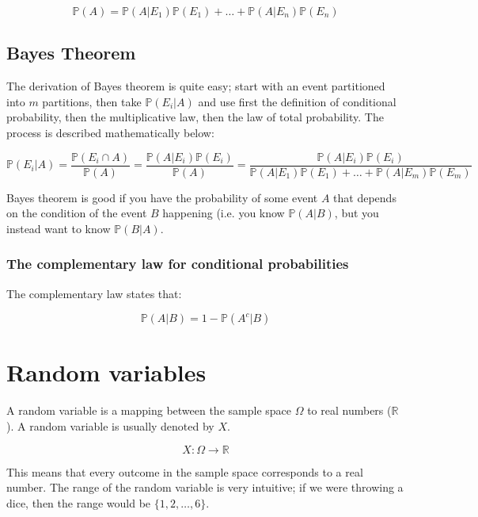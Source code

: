 \begin{dmath*}
	\mathbb{P}(A) = \mathbb{P}(A|E_1)\mathbb{P}(E_1) + \dots + \mathbb{P}(A|E_n)\mathbb{P}(E_n)
\end{dmath*}

\subsection{Bayes Theorem}

The derivation of Bayes theorem is quite easy; start with an event partitioned
into $m$ partitions, then take $\mathbb{P}(E_i|A)$ and use first the definition
of conditional probability, then the multiplicative law, then the law of total
probability. The process is described mathematically below:

\begin{dmath*}
	\mathbb{P}(E_i|A) = \frac{\mathbb{P}(E_i \cap A)}{\mathbb{P}(A)} = \frac{\mathbb{P}(A|E_i)\mathbb{P}(E_i)}{\mathbb{P}(A)} = \frac{\mathbb{P}(A|E_i)\mathbb{P}(E_i)}{\mathbb{P}(A|E_1)\mathbb{P}(E_1) + \dots + \mathbb{P}(A|E_m)\mathbb{P}(E_m)}
\end{dmath*}

Bayes theorem is good if you have the probability of some event $A$ that depends
on the condition of the event $B$ happening (i.e. you know $\mathbb{P}(A|B)$,
but you instead want to know $\mathbb{P}(B|A)$.

\subsubsection{The complementary law for conditional probabilities}

The complementary law states that:

\begin{dmath*}
	\mathbb{P}(A|B) = 1 - \mathbb{P}(A^c|B)
\end{dmath*}

\section{Random variables}

A random variable is a mapping between the sample space $\Omega$ to real numbers
($\mathbb{R}$). A random variable is usually denoted by $X$.

\begin{dmath*}
	X : \Omega \rightarrow \mathbb{R}
\end{dmath*}

This means that every outcome in the sample space corresponds to a real number.
The range of the random variable is very intuitive; if we were throwing a dice,
then the range would be $\{1, 2, \dots, 6\}$.

